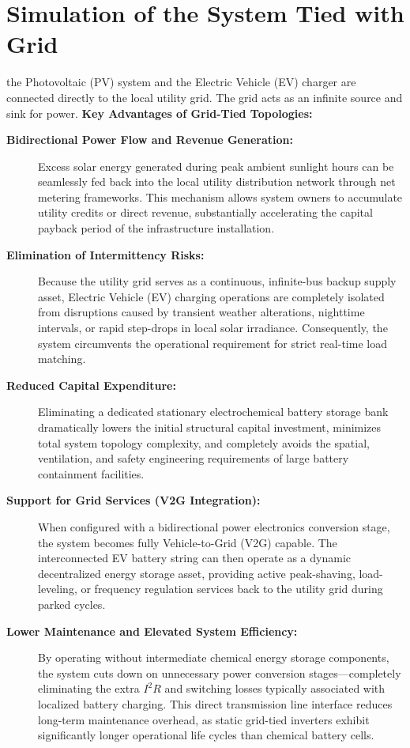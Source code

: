\section{Simulation of the System Tied with Grid}
the Photovoltaic (PV) system and the Electric Vehicle (EV) charger are connected directly to the local utility grid. The grid acts as an infinite source and sink for power.
\vspace{0.5pt}
\noindent\textbf{Key Advantages of Grid-Tied Topologies:}
\begin{description}
    \item[\textbf{Bidirectional Power Flow and Revenue Generation:}] 
    Excess solar energy generated during peak ambient sunlight hours can be seamlessly fed back into the local utility distribution network through net metering frameworks. This mechanism allows system owners to accumulate utility credits or direct revenue, substantially accelerating the capital payback period of the infrastructure installation.
    
    \item[\textbf{Elimination of Intermittency Risks:}] 
    Because the utility grid serves as a continuous, infinite-bus backup supply asset, Electric Vehicle (EV) charging operations are completely isolated from disruptions caused by transient weather alterations, nighttime intervals, or rapid step-drops in local solar irradiance. Consequently, the system circumvents the operational requirement for strict real-time load matching.
    
    \item[\textbf{Reduced Capital Expenditure:}] 
    Eliminating a dedicated stationary electrochemical battery storage bank dramatically lowers the initial structural capital investment, minimizes total system topology complexity, and completely avoids the spatial, ventilation, and safety engineering requirements of large battery containment facilities.
    
    \item[\textbf{Support for Grid Services (V2G Integration):}] 
    When configured with a bidirectional power electronics conversion stage, the system becomes fully Vehicle-to-Grid (V2G) capable. The interconnected EV battery string can then operate as a dynamic decentralized energy storage asset, providing active peak-shaving, load-leveling, or frequency regulation services back to the utility grid during parked cycles.
    
    \item[\textbf{Lower Maintenance and Elevated System Efficiency:}] 
    By operating without intermediate chemical energy storage components, the system cuts down on unnecessary power conversion stages—completely eliminating the extra $I^2R$ and switching losses typically associated with localized battery charging. This direct transmission line interface reduces long-term maintenance overhead, as static grid-tied inverters exhibit significantly longer operational life cycles than chemical battery cells.
\end{description}

